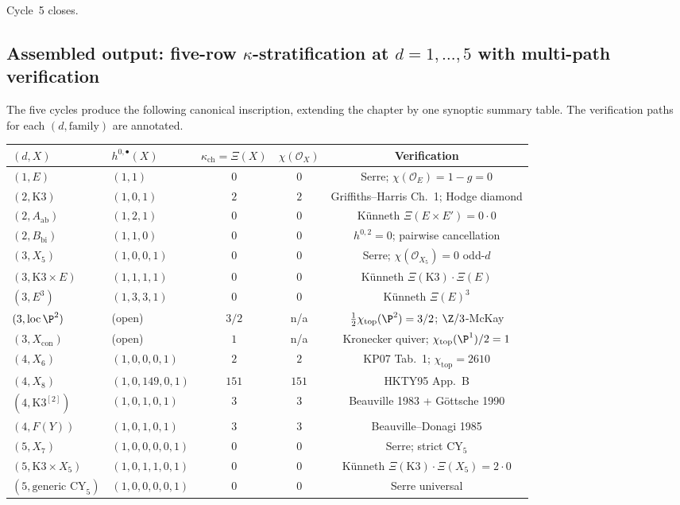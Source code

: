 Cycle~5 closes.

\subsection*{Assembled output: five-row $\kappa$-stratification
  at $d = 1, \ldots, 5$ with multi-path verification}

The five cycles produce the following canonical inscription,
extending the chapter by one synoptic summary table. The
verification paths for each $(d, \text{family})$ are annotated.

\begin{center}\small
\begin{tabular}{llccc}
\toprule
$(d, X)$ & $h^{0, \bullet}(X)$ &
  $\kappa_{\mathrm{ch}} = \Xi(X)$ & $\chi(\mathcal{O}_X)$ &
  Verification \\
\midrule
$(1, E)$ & $(1, 1)$ & $0$ & $0$ &
  Serre; $\chi(\mathcal{O}_E) = 1 - g = 0$ \\
$(2, \mathrm{K3})$ & $(1, 0, 1)$ & $2$ & $2$ &
  Griffiths--Harris Ch.~1; Hodge diamond \\
$(2, A_{\mathrm{ab}})$ & $(1, 2, 1)$ & $0$ & $0$ &
  K\"unneth $\Xi(E \times E') = 0 \cdot 0$ \\
$(2, B_{\mathrm{bi}})$ & $(1, 1, 0)$ & $0$ & $0$ &
  $h^{0, 2} = 0$; pairwise cancellation \\
$(3, X_5)$ & $(1, 0, 0, 1)$ & $0$ & $0$ &
  Serre; $\chi(\mathcal{O}_{X_5}) = 0$ odd-$d$ \\
$(3, \mathrm{K3} \times E)$ & $(1, 1, 1, 1)$ & $0$ & $0$ &
  K\"unneth $\Xi(\mathrm{K3}) \cdot \Xi(E)$ \\
$(3, E^3)$ & $(1, 3, 3, 1)$ & $0$ & $0$ &
  K\"unneth $\Xi(E)^3$ \\
$(3, \mathrm{loc}\,\P^2)$ & (open) & $3/2$ & n/a &
  $\tfrac{1}{2}\chi_{\mathrm{top}}(\P^2) = 3/2$;
  $\Z/3$-McKay \\
$(3, X_{\mathrm{con}})$ & (open) & $1$ & n/a &
  Kronecker quiver; $\chi_{\mathrm{top}}(\P^1)/2 = 1$ \\
$(4, X_6)$ & $(1, 0, 0, 0, 1)$ & $2$ & $2$ &
  KP07 Tab.~1; $\chi_{\mathrm{top}} = 2610$ \\
$(4, X_8)$ & $(1, 0, 149, 0, 1)$ & $151$ & $151$ &
  HKTY95 App.~B \\
$(4, \mathrm{K3}^{[2]})$ & $(1, 0, 1, 0, 1)$ & $3$ & $3$ &
  Beauville 1983 + G\"ottsche 1990 \\
$(4, F(Y))$ & $(1, 0, 1, 0, 1)$ & $3$ & $3$ &
  Beauville--Donagi 1985 \\
$(5, X_7)$ & $(1, 0, 0, 0, 0, 1)$ & $0$ & $0$ &
  Serre; strict CY$_5$ \\
$(5, \mathrm{K3}\times X_5)$ & $(1, 0, 1, 1, 0, 1)$ & $0$ & $0$ &
  K\"unneth $\Xi(\mathrm{K3}) \cdot \Xi(X_5) = 2 \cdot 0$ \\
$(5, \text{generic CY}_5)$ & $(1, 0, 0, 0, 0, 1)$ & $0$ & $0$ &
  Serre universal \\
\bottomrule
\end{tabular}
\end{center}


